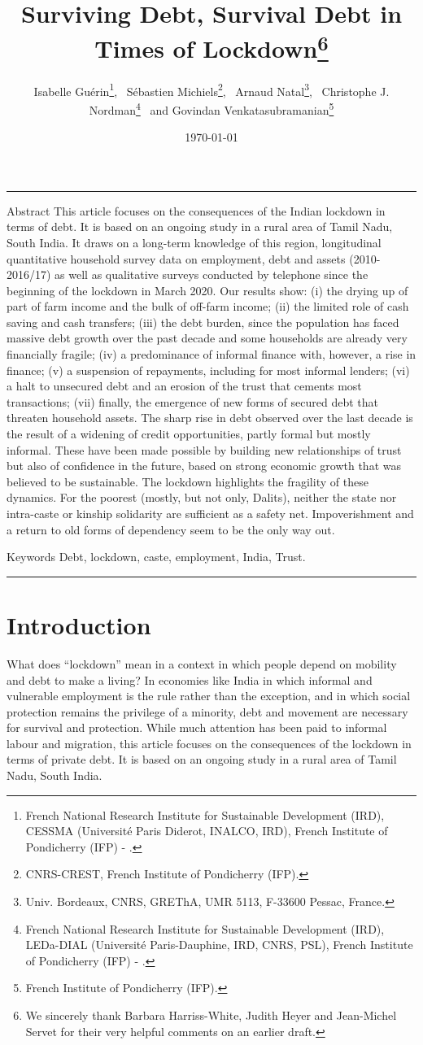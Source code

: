 \documentclass[a4paper, 11pt, onecolumn]{article}
\title{Surviving Debt, Survival Debt in Times of Lockdown\thanks{We sincerely thank Barbara Harriss-White, Judith Heyer and Jean-Michel Servet for their very helpful comments on an earlier draft.}}
\author{Isabelle Guérin\thanks{French National Research Institute for Sustainable Development (IRD), CESSMA (Université Paris Diderot, INALCO, IRD), French Institute of Pondicherry (IFP) - \email{isabelle.guerin@ird.fr}.}, ~Sébastien Michiels\thanks{CNRS-CREST, French Institute of Pondicherry (IFP).}, ~Arnaud Natal\thanks{Univ. Bordeaux, CNRS, GREThA, UMR 5113, F-33600 Pessac, France.}, ~Christophe J. Nordman\thanks{French National Research Institute for Sustainable Development (IRD), LEDa-DIAL (Université Paris-Dauphine, IRD, CNRS, PSL), French Institute of Pondicherry (IFP) - \email{nordman@dial.prd}.} ~and Govindan Venkatasubramanian\thanks{French Institute of Pondicherry (IFP).}}
\date{\today}
\begin{document}
\maketitle

\hrule 
\vspace{0.3cm}

\begin{resab}{Abstract}
This article focuses on the consequences of the Indian lockdown in terms of debt. It is based on an ongoing study in a rural area of Tamil Nadu, South India. It draws on a long-term knowledge of this region, longitudinal quantitative household survey data on employment, debt and assets (2010-2016/17) as well as qualitative surveys conducted by telephone since the beginning of the lockdown in March 2020. 
Our results show: (i) the drying up of part of farm income and the bulk of off-farm income; (ii) the limited role of cash saving and cash transfers; (iii) the debt burden, since the population has faced massive debt growth over the past decade and some households are already very financially fragile; (iv) a predominance of informal finance with, however, a rise in finance; (v) a suspension of repayments, including for most informal lenders; (vi) a halt to unsecured debt and an erosion of the trust that cements most transactions; (vii) finally, the emergence of new forms of secured debt that threaten household assets. The sharp rise in debt observed over the last decade is the result of a widening of credit opportunities, partly formal but mostly informal. These have been made possible by building new relationships of trust but also of confidence in the future, based on strong economic growth that was believed to be sustainable. The lockdown highlights the fragility of these dynamics. For the poorest (mostly, but not only, Dalits), neither the state nor intra-caste or kinship solidarity are sufficient as a safety net. Impoverishment and a return to old forms of dependency seem to be the only way out.  

\end{resab}

\begin{motkey}{Keywords}
Debt, lockdown, caste, employment, India, Trust.
\end{motkey}


\hrule





\section*{Introduction}
\label{section:introduction}
What does ``lockdown'' mean in a context in which people depend on mobility and debt to make a living? In economies like India in which informal and vulnerable employment is the rule rather than the exception, and in which social protection remains the privilege of a minority, debt and movement are necessary for survival and protection. 
While much attention has been paid to informal labour and migration, this article focuses on the consequences of the lockdown in terms of private debt. It is based on an ongoing study in a rural area of Tamil Nadu, South India.
\end{document}
